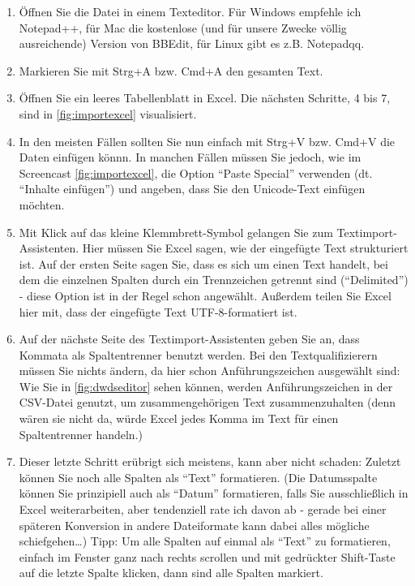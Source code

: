 \documentclass[]{article}
\begin{document}
\begin{enumerate}
\def\labelenumi{\arabic{enumi}.}
\item
  Öffnen Sie die Datei in einem Texteditor. Für Windows empfehle ich
  Notepad++, für Mac die kostenlose (und für unsere Zwecke völlig
  ausreichende) Version von BBEdit, für Linux gibt es z.B. Notepadqq.
\item
  Markieren Sie mit Strg+A bzw. Cmd+A den gesamten Text.
\item
  Öffnen Sie ein leeres Tabellenblatt in Excel. Die nächsten Schritte, 4
  bis 7, sind in \ref{fig:importexcel} visualisiert.
\item
  In den meisten Fällen sollten Sie nun einfach mit Strg+V bzw. Cmd+V
  die Daten einfügen könnn. In manchen Fällen müssen Sie jedoch, wie im
  Screencast \ref{fig:importexcel}, die Option ``Paste Special''
  verwenden (dt. ``Inhalte einfügen'') und angeben, dass Sie den
  Unicode-Text einfügen möchten.
\item
  Mit Klick auf das kleine Klemmbrett-Symbol gelangen Sie zum
  Textimport-Assistenten. Hier müssen Sie Excel sagen, wie der
  eingefügte Text strukturiert ist. Auf der ersten Seite sagen Sie, dass
  es sich um einen Text handelt, bei dem die einzelnen Spalten durch ein
  Trennzeichen getrennt sind (``Delimited'') - diese Option ist in der
  Regel schon angewählt. Außerdem teilen Sie Excel hier mit, dass der
  eingefügte Text UTF-8-formatiert ist.
\item
  Auf der nächste Seite des Textimport-Assistenten geben Sie an, dass
  Kommata als Spaltentrenner benutzt werden. Bei den Textqualifizierern
  müssen Sie nichts ändern, da hier schon Anführungszeichen ausgewählt
  sind: Wie Sie in \ref{fig:dwdseditor} sehen können, werden
  Anführungszeichen in der CSV-Datei genutzt, um zusammengehörigen Text
  zusammenzuhalten (denn wären sie nicht da, würde Excel jedes Komma im
  Text für einen Spaltentrenner handeln.)
\item
  Dieser letzte Schritt erübrigt sich meistens, kann aber nicht schaden:
  Zuletzt können Sie noch alle Spalten als ``Text'' formatieren. (Die
  Datumsspalte können Sie prinzipiell auch als ``Datum'' formatieren,
  falls Sie ausschließlich in Excel weiterarbeiten, aber tendenziell
  rate ich davon ab - gerade bei einer späteren Konversion in andere
  Dateiformate kann dabei alles mögliche schiefgehen\ldots{}) Tipp: Um
  alle Spalten auf einmal als ``Text'' zu formatieren, einfach im
  Fenster ganz nach rechts scrollen und mit gedrückter Shift-Taste auf
  die letzte Spalte klicken, dann sind alle Spalten markiert.
\end{enumerate}
\end{document}
